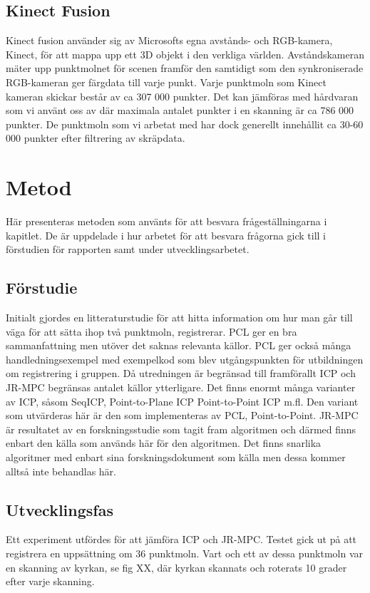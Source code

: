 \subsection{Kinect Fusion}

Kinect fusion använder sig av Microsofts egna avstånds- och RGB-kamera, Kinect, för att mappa upp ett 3D objekt i den verkliga världen. Avståndskameran mäter upp punktmolnet för scenen framför den samtidigt som den synkroniserade RGB-kameran ger färgdata till varje punkt. 
Varje punktmoln som Kinect kameran skickar består av ca 307 000 punkter. Det kan jämföras med hårdvaran som vi använt oss av där maximala antalet punkter i en skanning är ca 786 000 punkter. De punktmoln som vi arbetat med har dock generellt innehållit ca 30-60 000 punkter efter filtrering av skräpdata.

\section{Metod}
\label{sec:method-karlsson}

Här presenteras metoden som använts för att besvara frågeställningarna i kapitlet. De är uppdelade i hur arbetet för att besvara frågorna gick till i förstudien för rapporten samt under utvecklingsarbetet.

\subsection{Förstudie}
Initialt gjordes en litteraturstudie för att hitta information om hur man går till väga för att sätta ihop två punktmoln, registrerar.  PCL ger en bra sammanfattning men utöver det saknas relevanta källor. PCL ger också många handledningsexempel med exempelkod som blev utgångspunkten för utbildningen om registrering i gruppen. Då utredningen är begränsad till framförallt ICP och JR-MPC begränsas antalet källor ytterligare. Det finns enormt många varianter av ICP, såsom SeqICP, Point-to-Plane ICP Point-to-Point ICP m.fl. Den variant som utvärderas här är den som implementeras av PCL, Point-to-Point. JR-MPC är resultatet av en forskningsstudie som tagit fram algoritmen och därmed finns enbart den källa som används här för den algoritmen. Det finns snarlika algoritmer med enbart sina forskningsdokument som källa men dessa kommer alltså inte behandlas här.

\subsection{Utvecklingsfas}
Ett experiment utfördes för att jämföra ICP och JR-MPC. Testet gick ut på att registrera en uppsättning om 36 punktmoln. Vart och ett av dessa punktmoln var en skanning av kyrkan, se fig XX, där kyrkan skannats och roterats 10 grader efter varje skanning. 



